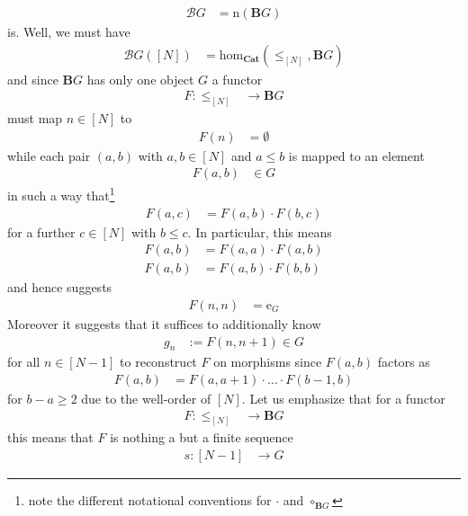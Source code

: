 \begin{align*}
  \mathcal{B}G
  &=
  \mathrm{n}(\mathbf{B}G)
\end{align*}
is. Well, we must have
\begin{align*}
  \mathcal{B}G
  \left(
    [N]
  \right)
  &=
  \mathrm{hom}_{\mathbf{Cat}}
  \left(
    \pmb{\leq}_{[N]},
    \mathbf{B}G
  \right)
\end{align*}
and since $\mathbf{B}G$ has only one object $G$ a functor
\begin{align*}
  F
  \colon
  \pmb{\leq}_{[N]}
  &\rightarrow
  \mathbf{B}G
\end{align*}
must map $n \in [N]$ to
\begin{align*}
  F(n)
  &=
  \emptyset
\end{align*}
while each pair $(a,b)$ with $a,b \in [N]$ and $a \leq b$ is mapped to an element
\begin{align*}
  F(a,b)
  &\in
  G
\end{align*}
in such a way that\footnote{note the different notational conventions for $\cdot$ and $\circ_{\mathbf{B}G}$}
\begin{align*}
  F(a,c)
  &=
  F(a,b)
  \cdot
  F(b,c)
\end{align*}
for a further $c \in [N]$ with $b \leq c$. In particular, this means
\begin{align*}
  F(a,b)
  &=
  F(a,a)
  \cdot
  F(a,b)
  \\
  F(a,b)
  &=
  F(a,b)
  \cdot
  F(b,b)
\end{align*}
and hence suggests
\begin{align*}
  F(n,n)
  &=
  \mathrm{e}_{G}
\end{align*}
Moreover it suggests that it suffices to additionally know
\begin{align*}
  g_{n}
  &:=
  F(n,n + 1)
  \in 
  G
\end{align*}
for all $n \in [N - 1]$ to reconstruct $F$ on morphisms since $F(a,b)$ factors as
\begin{align*}
  F(a,b)
  &=
  F(a,a + 1)
  \cdot
  \ldots
  \cdot
  F(b - 1,b)
\end{align*}
for $b - a \geq 2$ due to the well-order of $[N]$. Let us emphasize that for a functor
\begin{align*}
  F
  \colon
  \pmb{\leq}_{[N]}
  &\rightarrow
  \mathbf{B}G
\end{align*}
this means that $F$ is nothing a but a finite sequence
\begin{align*}
  s
  \colon
  [N - 1]
  &\rightarrow
  G
\end{align*}
